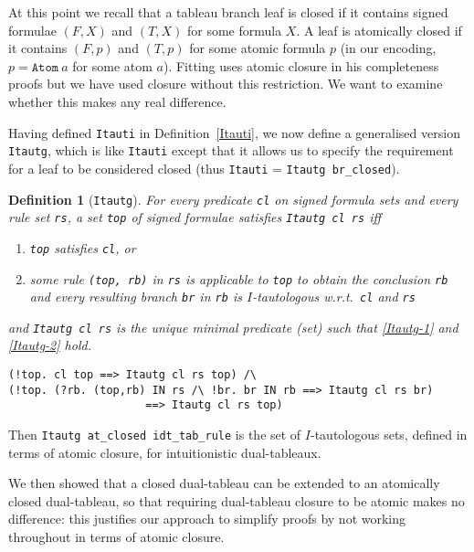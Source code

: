 \documentclass[a4paper]{article}
\newtheorem{definition}{Definition}
\begin{document}
At this point we recall that a tableau branch leaf is closed if it contains
signed formulae $(F, X)$ and $(T, X)$ for some formula $X$.
A leaf is atomically closed if it contains $(F, p)$ and $(T, p)$
for some atomic formula $p$ (in our encoding, $p = \texttt{Atom}\ a$ for some
atom $a$).
Fitting \cite[Definition~2]{fitting-dual-tableau} uses atomic closure
in his completeness proofs but
we have used closure without this restriction. We 
want to examine whether this makes any real difference.

Having defined \texttt{Itauti} in Definition~\ref{Itauti},
we now define a generalised version \texttt{Itautg},
which is like \texttt{Itauti} except that it allows us
to specify the requirement for a leaf to be considered closed
(thus \texttt{Itauti} = \texttt{Itautg br\_closed}).

\begin{definition}[\texttt{Itautg}]\label{Itautg} 
  For every predicate \texttt{cl} on signed formula sets and
  every rule set \texttt{rs}, a set \texttt{top} of signed
  formulae satisfies \texttt{Itautg cl rs} iff
  \begin{enumerate} 
  \item \label{Itautg-1}
    \texttt{top} satisfies \texttt{cl}, or
  \item \label{Itautg-2}
   some rule \texttt{(top, rb)} in \texttt{rs} 
   is applicable to \texttt{top} to obtain the conclusion \texttt{rb} 
   and every resulting branch \texttt{br} in \texttt{rb} is
  $I$-tautologous w.r.t.\ \texttt{cl} and \texttt{rs}
  \end{enumerate} 
  and \texttt{Itautg cl rs} is the unique minimal predicate (set) such that
  \ref{Itautg-1} and \ref{Itautg-2} hold.
\begin{verbatim} 
(!top. cl top ==> Itautg cl rs top) /\ 
(!top. (?rb. (top,rb) IN rs /\ !br. br IN rb ==> Itautg cl rs br)  
                     ==> Itautg cl rs top)
\end{verbatim}
\end{definition}

Then \texttt{Itautg at\_closed idt\_tab\_rule} is the set of
$I$-tautologous sets, defined in terms of atomic closure, for
intuitionistic dual-tableaux.

We then showed 
that a closed dual-tableau can be extended to an atomically closed
dual-tableau, so
that requiring dual-tableau closure to be atomic makes no difference:
this justifies our approach to simplify proofs by not working throughout
in terms of atomic closure.
\end{document}
